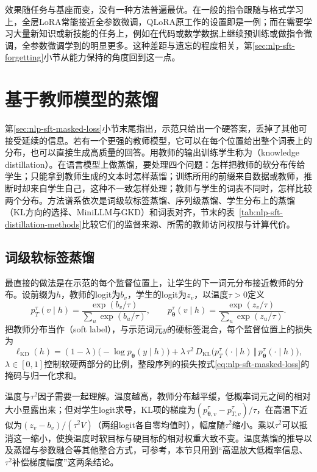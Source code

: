 效果随任务与基座而变，没有一种方法普遍最优。在一般的指令跟随与格式学习上，全层LoRA常能接近全参数微调，QLoRA原工作的设置即是一例；而在需要学习大量新知识或新技能的任务上，例如在代码或数学数据上继续预训练或做指令微调，全参数微调学到的明显更多。这种差距与遗忘的程度相关，第\ref{sec:nlp-sft-forgetting}小节从能力保持的角度回到这一点。

\section{基于教师模型的蒸馏}
\label{sec:nlp-sft-distillation}

第\ref{sec:nlp-sft-masked-loss}小节末尾指出，示范只给出一个硬答案，丢掉了其他可接受延续的信息。若有一个更强的教师模型，它可以在每个位置给出整个词表上的分布，也可以直接生成高质量的回答。用教师的输出训练学生称为（knowledge distillation）。在语言模型上做蒸馏，要处理四个问题：怎样把教师的软分布传给学生；只能拿到教师生成的文本时怎样蒸馏；训练所用的前缀来自数据或教师，推断时却来自学生自己，这种不一致怎样处理；教师与学生的词表不同时，怎样比较两个分布。方法谱系依次是词级软标签蒸馏、序列级蒸馏、学生分布上的蒸馏（KL方向的选择、MiniLLM与GKD）和词表对齐，节末的表~\ref{tab:nlp-sft-distillation-methods}比较它们的监督来源、所需的教师访问权限与计算代价。

\subsection{词级软标签蒸馏}
\label{sec:nlp-sft-soft-distillation}

最直接的做法是在示范的每个监督位置上，让学生的下一词元分布接近教师的分布。设前缀为$h$，教师的logit为$b_v$，学生的logit为$z_v$，以温度$\tau>0$定义
\[
 p_T^{\tau}(v\mid h)=\frac{\exp(b_v/\tau)}{\sum_{u}\exp(b_u/\tau)},\qquad
 p_{\bm\theta}^{\tau}(v\mid h)=\frac{\exp(z_v/\tau)}{\sum_{u}\exp(z_u/\tau)}.
\]
把教师分布当作（soft label），与示范词元$y$的硬标签混合，每个监督位置上的损失为
\begin{equation}
 \ell_{\mathrm{KD}}(h)=(1-\lambda)\bigl(-\log p_{\bm\theta}(y\mid h)\bigr)
 +\lambda\,\tau^2\,D_{\mathrm{KL}}\bigl(p_T^{\tau}(\cdot\mid h)\,\Vert\,p_{\bm\theta}^{\tau}(\cdot\mid h)\bigr),
 \label{eq:nlp-sft-word-kd}
\end{equation}
$\lambda\in[0,1]$控制软硬两部分的比例，整段序列的损失按式\eqref{eq:nlp-sft-masked-loss}的掩码与归一化求和。

温度与$\tau^2$因子需要一起理解。温度越高，教师分布越平缓，低概率词元之间的相对大小显露出来；但对学生logit求导，KL项的梯度为$(p_{\bm\theta,v}^{\tau}-p_{T,v}^{\tau})/\tau$，在高温下近似为$(z_v-b_v)/(\tau^2V)$（两组logit各自零均值时），幅度随$\tau^2$缩小。乘以$\tau^2$可以抵消这一缩小，使换温度时软目标与硬目标的相对权重大致不变。温度蒸馏的推导以及蒸馏与参数融合等其他整合方式，可参考，本节只用到“高温放大低概率信息、$\tau^2$补偿梯度幅度”这两条结论。

